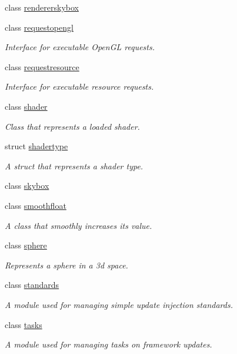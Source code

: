 \begin{DoxyCompactItemize}
class \hyperlink{classflounder_1_1rendererskybox}{rendererskybox}
\item 
class \hyperlink{classflounder_1_1requestopengl}{requestopengl}
\begin{DoxyCompactList}\small\item\em Interface for executable Open\+GL requests. \end{DoxyCompactList}\item 
class \hyperlink{classflounder_1_1requestresource}{requestresource}
\begin{DoxyCompactList}\small\item\em Interface for executable resource requests. \end{DoxyCompactList}\item 
class \hyperlink{classflounder_1_1shader}{shader}
\begin{DoxyCompactList}\small\item\em Class that represents a loaded shader. \end{DoxyCompactList}\item 
struct \hyperlink{structflounder_1_1shadertype}{shadertype}
\begin{DoxyCompactList}\small\item\em A struct that represents a shader type. \end{DoxyCompactList}\item 
class \hyperlink{classflounder_1_1skybox}{skybox}
\item 
class \hyperlink{classflounder_1_1smoothfloat}{smoothfloat}
\begin{DoxyCompactList}\small\item\em A class that smoothly increases its value. \end{DoxyCompactList}\item 
class \hyperlink{classflounder_1_1sphere}{sphere}
\begin{DoxyCompactList}\small\item\em Represents a sphere in a 3d space. \end{DoxyCompactList}\item 
class \hyperlink{classflounder_1_1standards}{standards}
\begin{DoxyCompactList}\small\item\em A module used for managing simple update injection standards. \end{DoxyCompactList}\item 
class \hyperlink{classflounder_1_1tasks}{tasks}
\begin{DoxyCompactList}\small\item\em A module used for managing tasks on framework updates. \end{DoxyCompactList}\item 

\end{DoxyCompactItemize}
